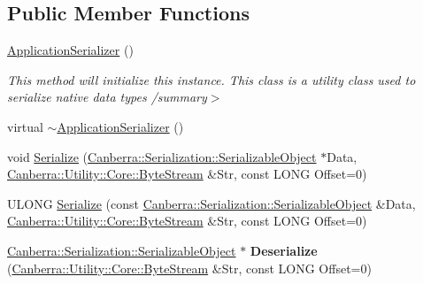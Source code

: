 \subsection*{Public Member Functions}
\begin{DoxyCompactItemize}
\item 
\mbox{\label{class_canberra_1_1_data_types_1_1_serialization_1_1_application_serializer_ae81039f8bbf3ec90288a5200599bacbb}} 
\hyperlink{class_canberra_1_1_data_types_1_1_serialization_1_1_application_serializer_ae81039f8bbf3ec90288a5200599bacbb}{Application\+Serializer} ()
\begin{DoxyCompactList}\small\item\em This method will initialize this instance. This class is a utility class used to serialize native data types /summary$>$ \end{DoxyCompactList}\item 
virtual \hyperlink{class_canberra_1_1_data_types_1_1_serialization_1_1_application_serializer_a6246aca8efdac2cbc550645380806a23_a6246aca8efdac2cbc550645380806a23}{$\sim$\+Application\+Serializer} ()
\item 
void \hyperlink{class_canberra_1_1_data_types_1_1_serialization_1_1_application_serializer_aa0e18d74f0a1fad87295808182febf52_aa0e18d74f0a1fad87295808182febf52}{Serialize} (\hyperlink{class_canberra_1_1_serialization_1_1_serializable_object}{Canberra\+::\+Serialization\+::\+Serializable\+Object} $\ast$Data, \hyperlink{class_canberra_1_1_utility_1_1_core_1_1_byte_stream}{Canberra\+::\+Utility\+::\+Core\+::\+Byte\+Stream} \&Str, const L\+O\+NG Offset=0)
\item 
U\+L\+O\+NG \hyperlink{class_canberra_1_1_data_types_1_1_serialization_1_1_application_serializer_aba7a88cedf211a3e47d3efd4bf2e735e_aba7a88cedf211a3e47d3efd4bf2e735e}{Serialize} (const \hyperlink{class_canberra_1_1_serialization_1_1_serializable_object}{Canberra\+::\+Serialization\+::\+Serializable\+Object} \&Data, \hyperlink{class_canberra_1_1_utility_1_1_core_1_1_byte_stream}{Canberra\+::\+Utility\+::\+Core\+::\+Byte\+Stream} \&Str, const L\+O\+NG Offset=0)
\item 
\mbox{\label{class_canberra_1_1_data_types_1_1_serialization_1_1_application_serializer_a622b24eba826b2ef7190f235c6eec303}} 
\hyperlink{class_canberra_1_1_serialization_1_1_serializable_object}{Canberra\+::\+Serialization\+::\+Serializable\+Object} $\ast$ {\bfseries Deserialize} (\hyperlink{class_canberra_1_1_utility_1_1_core_1_1_byte_stream}{Canberra\+::\+Utility\+::\+Core\+::\+Byte\+Stream} \&Str, const L\+O\+NG Offset=0)

\end{DoxyCompactItemize}
